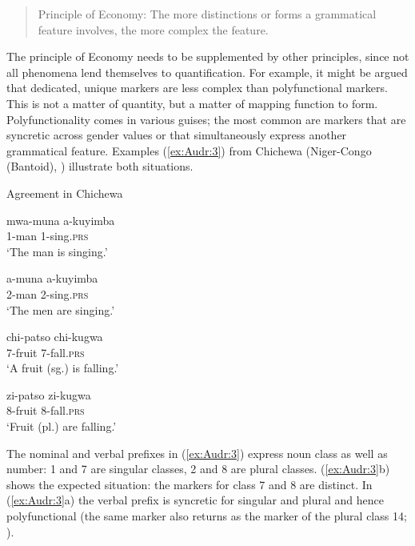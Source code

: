 \documentclass[output=collectionpaper]{langsci/langscibook}
\begin{document}
\begin{quote}
Principle of Economy: The more distinctions or forms a grammatical feature involves, the more complex the feature.
\end{quote}

The principle of Economy needs to be supplemented by other principles, since not all phenomena lend themselves to quantification. For example, it might be argued that dedicated, unique markers are less complex than polyfunctional markers. This is not a matter of quantity, but a matter of mapping function to form. Polyfunctionality comes in various guises; the most common are markers that are syncretic across gender values or that simultaneously express another grammatical feature. Examples ‎(\ref{ex:Audr:3}) from Chichewa (Niger-Congo (Bantoid), \citealt{Bentley2001}) illustrate both situations.

\ea
\label{ex:Audr:3}
Agreement in Chichewa\\
\begin{xlist}
\ex
\begin{minipage}[t]{0.4\textwidth}
\gll mwa-muna a-kuyimba\\
     1-man 1-sing.\textsc{prs} \\
\glt `The man is singing.'\\
\end{minipage}%
\begin{minipage}[t]{0.4\textwidth}
\gll a-muna a-kuyimba\\
     2-man 2-sing.\textsc{prs}\\
\glt `The men are singing.'
\end{minipage}
\ex
\begin{minipage}[t]{0.4\textwidth}
\gll chi-patso chi-kugwa  \\
     7-fruit 7-fall.\textsc{prs}\\
\glt `A fruit (sg.\@) is falling.'\\
\end{minipage}%
\begin{minipage}[t]{0.4\textwidth}
\gll zi-patso zi-kugwa\\
     8-fruit 8-fall.\textsc{prs}\\
\glt  `Fruit (pl.\@) are falling.'
\end{minipage}
\end{xlist}
\z

The nominal and verbal prefixes in ‎(\ref{ex:Audr:3}) express noun class as well as number: 1 and 7 are singular classes, 2 and 8 are plural classes. ‎(\ref{ex:Audr:3}b) shows the expected situation: the markers for class 7 and 8 are distinct. In ‎(\ref{ex:Audr:3}a) the verbal prefix is syncretic for singular and plural and hence polyfunctional (the same marker also returns as the marker of the plural class 14; \citealt[6]{Mchombo2004}).
\end{document}
